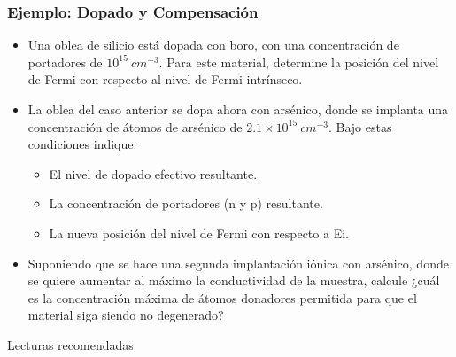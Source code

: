\documentclass[10pt,t,aspectratio=169]{beamer}
\begin{document}
\begin{frame}[t]
  \frametitle{Ejemplo: Dopado y Compensación}

  \begin{itemize}
    \item Una oblea de silicio está dopada con boro, con una concentración de portadores de $10^{15}\ cm^{-3}$. Para este material, determine la posición del nivel de Fermi con respecto al nivel de Fermi intrínseco.
    \item La oblea del caso anterior se dopa ahora con arsénico, donde se implanta una concentración de átomos de arsénico de $2.1\times{}10^{15}\ cm^{-3}$. Bajo estas condiciones indique:
    \begin{itemize}
      \item El nivel de dopado efectivo resultante.
      \item La concentración de portadores (n y p) resultante.
      \item La nueva posición del nivel de Fermi con respecto a Ei.
    \end{itemize}
    \item Suponiendo que se hace una segunda implantación iónica con arsénico, donde se quiere aumentar al máximo la conductividad de la muestra, calcule ¿cuál es la concentración máxima de átomos donadores permitida para que el material siga siendo no degenerado?
  \end{itemize}

\end{frame}

\begin{frame}{Lecturas recomendadas}
    
\end{frame}
\end{document}
